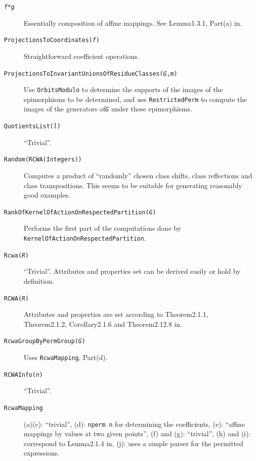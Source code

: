 \documentclass[a4paper,11pt]{report}
\begin{document}
{\begin{description}
\item[{ \texttt{\mbox{\texttt{\mdseries\slshape f}}*\mbox{\texttt{\mdseries\slshape g}}} }]  Essentially composition of affine mappings. See Lemma{\nobreakspace}1.3.1,
Part{\nobreakspace}(a) in{\nobreakspace}\cite{Kohl05}. 
\item[{ \texttt{ProjectionsToCoordinates(\mbox{\texttt{\mdseries\slshape f}})} }]  Straightforward coefficient operations. 
\item[{ \texttt{ProjectionsToInvariantUnionsOfResidueClasses(\mbox{\texttt{\mdseries\slshape G}},\mbox{\texttt{\mdseries\slshape m}})} }]  Use \texttt{OrbitsModulo} to determine the supports of the images of the epimorphisms to be determined,
and use \texttt{RestrictedPerm} to compute the images of the generators of{\nobreakspace}\mbox{\texttt{\mdseries\slshape G}} under these epimorphisms. 
\item[{ \texttt{QuotientsList(\mbox{\texttt{\mdseries\slshape l}})} }]  ``Trivial''. 
\item[{ \texttt{Random(RCWA(Integers))} }]  Computes a product of ``randomly'' chosen class shifts, class reflections and class transpositions. This seems to
be suitable for generating reasonably good examples. 
\item[{ \texttt{RankOfKernelOfActionOnRespectedPartition(\mbox{\texttt{\mdseries\slshape G}})} }]  Performs the first part of the computations done by \texttt{KernelOfActionOnRespectedPartition}. 
\item[{ \texttt{Rcwa(\mbox{\texttt{\mdseries\slshape R}})} }]  ``Trivial''. \texttt{}\texttt{} Attributes and properties set can
be derived easily or hold by definition. 
\item[{ \texttt{RCWA(\mbox{\texttt{\mdseries\slshape R}})} }]  Attributes and properties are set according to Theorem{\nobreakspace}2.1.1,
Theorem{\nobreakspace}2.1.2, Corollary{\nobreakspace}2.1.6 and
Theorem{\nobreakspace}2.12.8 in{\nobreakspace}\cite{Kohl05}. 
\item[{ \texttt{RcwaGroupByPermGroup(\mbox{\texttt{\mdseries\slshape G}})} }]  Uses \texttt{RcwaMapping}, Part{\nobreakspace}(d). 
\item[{ \texttt{RCWAInfo(\mbox{\texttt{\mdseries\slshape n}})} }]  ``Trivial''. 
\item[{ \texttt{RcwaMapping} }]  (a)\texttt{}(c): ``trivial'', (d): \texttt{n\texttt{}perm \texttt{} n} for determining the coefficients, (e): ``affine mappings by values at two given points'', (f) and (g): ``trivial'', (h) and (i): correspond to Lemma{\nobreakspace}2.1.4 in{\nobreakspace}\cite{Kohl05}, (j): uses a simple parser for the permitted expressions. 

\end{description}}
\end{document}
